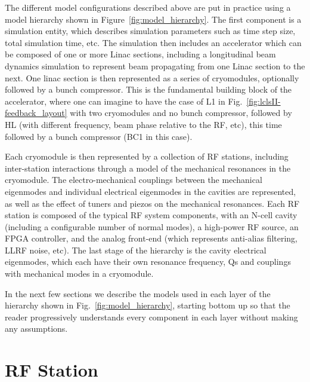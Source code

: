 \documentclass[a4paper,12pt]{article}
\begin{document}
The different model configurations described above are put in practice using a model hierarchy shown in Figure~\ref{fig:model_hierarchy}. The first component is a simulation entity, which describes simulation parameters such as time step size, total simulation time, etc. The simulation then includes an accelerator which can be composed of one or more Linac sections, including a longitudinal beam dynamics simulation to represent beam propagating from one Linac section to the next. One linac section is then represented as a series of cryomodules, optionally followed by a bunch compressor. This is the fundamental building block of the accelerator, where one can imagine to have the case of L1 in Fig.~\ref{fig:lclsII-feedback_layout} with two cryomodules and no bunch compressor, followed by HL (with different frequency, beam phase relative to the RF, etc), this time followed by a bunch compressor (BC1 in this case).

Each cryomodule is then represented by a collection of RF stations, including inter-station interactions through a model of the mechanical resonances in the cryomodule. The electro-mechanical couplings between the mechanical eigenmodes and individual electrical eigenmodes in the cavities are represented, as well as the effect of tuners and piezos on the mechanical resonances. Each RF station is composed of the typical RF system components, with an N-cell cavity (including a configurable number of normal modes), a high-power RF source, an FPGA controller, and the analog front-end (which represents anti-alias filtering, LLRF noise, etc). The last stage of the hierarchy is the cavity electrical eigenmodes, which each have their own resonance frequency, Qs and couplings with mechanical modes in a cryomodule.

In the next few sections we describe the models used in each layer of the hierarchy shown in Fig.~\ref{fig:model_hierarchy}, starting bottom up so that the reader progressively understands every component in each layer without making any assumptions.

\newpage

\section{RF Station}
\end{document}
